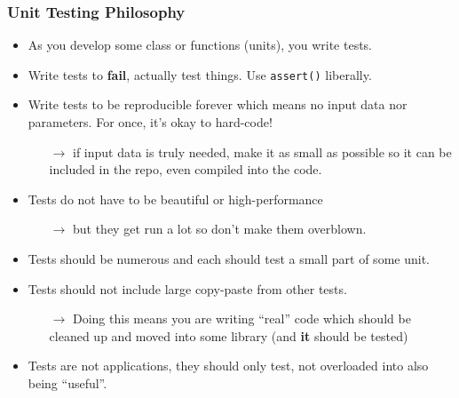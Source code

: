 \documentclass[xcolor=dvipsnames]{beamer}
\begin{document}
\begin{frame}
  \frametitle{Unit Testing Philosophy}

  \footnotesize
  \begin{itemize}
  \item As you develop some class or functions (units), you write tests.
  \item Write tests to \textbf{fail}, actually test things.  Use
    \texttt{assert()} liberally.
  \item Write tests to be reproducible forever which means no input
    data nor parameters.  For once, it's okay to hard-code!
    \begin{itemize}\scriptsize
    \item[$\to$] if input data is truly needed, make it as small as
      possible so it can be included in the repo, even compiled into
      the code.
    \end{itemize}
  \item Tests do not have to be beautiful or high-performance
    \begin{itemize}\scriptsize
    \item[$\to$] but they get run a lot so don't make them overblown.
    \end{itemize}
  \item Tests should be numerous and each should test a small part of some unit.
  \item Tests should not include large copy-paste from other tests.
    \begin{itemize}\scriptsize
    \item[$\to$] Doing this means you are writing ``real'' code which
      should be cleaned up and moved into some library (and
      \textbf{it} should be tested)
    \end{itemize}
  \item Tests are not applications, they should only test, not
    overloaded into also being ``useful''.
  \end{itemize}
  
\end{frame}
\end{document}
